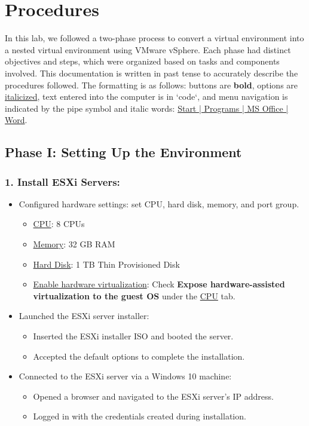 \documentclass[letterpaper,12pt]{article}
\begin{document}
\section{Procedures}
\label{sec:orged743f1}

In this lab, we followed a two-phase process to convert a virtual environment into a nested virtual environment using VMware vSphere. Each phase had distinct objectives and steps, which were organized based on tasks and components involved. This documentation is written in past tense to accurately describe the procedures followed. The formatting is as follows: buttons are \textbf{bold}, options are \uline{italicized}, text entered into the computer is in `code`, and menu navigation is indicated by the pipe symbol and italic words: \uline{Start | Programs | MS Office | Word}.

\subsection{Phase I: Setting Up the Environment}
\label{sec:orga16c172}
\subsubsection{1. Install ESXi Servers:}
\label{sec:org43697ff}
\begin{itemize}
\item Configured hardware settings: set CPU, hard disk, memory, and port group.
\begin{itemize}
\item \uline{CPU}: 8 CPUs
\item \uline{Memory}: 32 GB RAM
\item \uline{Hard Disk}: 1 TB Thin Provisioned Disk
\item \uline{Enable hardware virtualization}: Check \textbf{Expose hardware-assisted virtualization to the guest OS} under the \uline{CPU} tab.
\end{itemize}
\item Launched the ESXi server installer:
\begin{itemize}
\item Inserted the ESXi installer ISO and booted the server.
\item Accepted the default options to complete the installation.
\end{itemize}
\item Connected to the ESXi server via a Windows 10 machine:
\begin{itemize}
\item Opened a browser and navigated to the ESXi server's IP address.
\item Logged in with the credentials created during installation.
\end{itemize}
\end{itemize}
\end{document}

